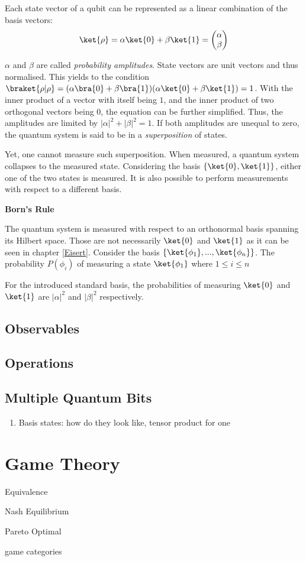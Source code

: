 Each state vector of a qubit can be represented as a linear combination of the basis vectors: \begin{equation}\ket{\rho}=\alpha\ket{0}+\beta\ket{1}=\begin{pmatrix}\alpha\\\beta\end{pmatrix}
\end{equation}

$\alpha$ and $\beta$ are called \textit{probability amplitudes}. State vectors are unit vectors and thus normalised. This yields to the condition $\braket{\rho\vert\rho}=(\alpha\bra{0}+\beta\bra{1})(\alpha\ket{0}+\beta\ket{1})=1$. With the inner product of a vector with itself being $1$, and the inner product of two orthogonal vectors being $0$, the equation can be further simplified. Thus, the amplitudes are limited by
$|\alpha|^2+|\beta|^2=1$.
If both amplitudes are unequal to zero, the quantum system is said to be in a  \textit{superposition} of states. 

Yet, one cannot measure such superposition. When measured, a quantum system collapses to the measured state. Considering the basis $\{\ket{0},\ket{1}\}$, either one of the two states is measured. It is also possible to perform measurements with respect to a different basis. 

\textbf{Born's Rule}

The quantum system is measured with respect to an orthonormal basis spanning its Hilbert space. Those are not necessarily $\ket{0}$ and $\ket{1}$ as it can be seen in chapter \ref{Eisert}. Consider the basis $\{\ket{\phi_1},...,\ket{\phi_n}\}$. The probability $P(\phi_i)$ of measuring a state $\ket{\phi_1}$ where $1\leq i\leq n$

For the introduced standard basis, the probabilities of measuring $\ket{0}$ and $\ket{1}$ are $|\alpha|^2$ and $|\beta|^2$ respectively. 



\subsection{Observables}

\subsection{Operations}

\subsection{Multiple Quantum Bits}
\begin{enumerate}
\item Basis states:
    how do they look like, tensor product for one
\end{enumerate}




\section{Game Theory}
Equivalence

Nash Equilibrium

Pareto Optimal

game categories